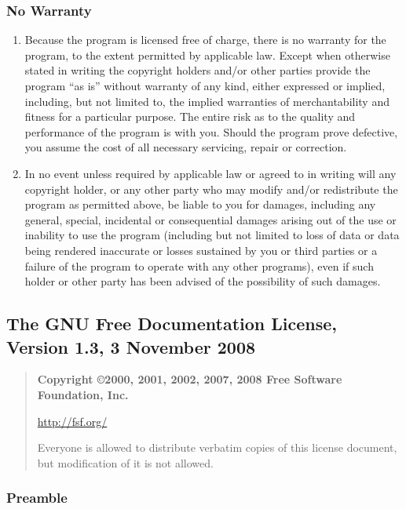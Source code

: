 \subsubsection{No Warranty}

\begin{enumerate}
\addtocounter{enumi}{9}
\item
  Because the program is licensed free of charge, there is no warranty for the program, to the extent permitted by applicable law. Except when otherwise stated in writing the copyright holders and/or other parties provide the program ``as is'' without warranty of any kind, either expressed or implied, including, but not limited to, the implied warranties of merchantability and fitness for a particular purpose. The entire risk as to the quality and performance of the program is with you. Should the program prove defective, you assume the cost of all necessary servicing, repair or correction.
\item
  In no event unless required by applicable law or agreed to in writing will any copyright holder, or any other party who may modify and/or redistribute the program as permitted above, be liable to you for damages, including any general, special, incidental or consequential damages arising out of the use or inability to use the program (including but not limited to loss of data or data being rendered inaccurate or losses sustained by you or third parties or a failure of the program to operate with any other programs), even if such holder or other party has been advised of the possibility of such damages.
\end{enumerate}


\subsection{The GNU Free Documentation License, Version 1.3, 3 November 2008}
\label{label_fdl}


  \begin{quote}
    \textbf{Copyright \copyright 2000, 2001, 2002, 2007, 2008 Free Software Foundation, Inc.}

    \url{http://fsf.org/}

    Everyone is allowed to distribute verbatim copies of this license document, but modification of it is not allowed.
  \end{quote}

\subsubsection{Preamble}

